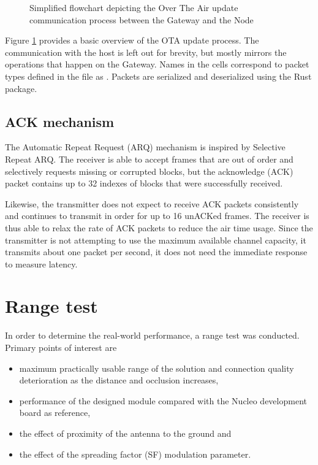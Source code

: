 \begin{figure}[p]
    
    \caption{\label{fig:ota-algo}Simplified flowchart depicting the Over The Air update communication process between the Gateway and the Node}
\end{figure}

Figure \ref{fig:ota-algo} provides a basic overview of the OTA update process. The communication with the host is left out for brevity, but mostly mirrors the operations that happen on the Gateway. Names in the cells correspond to packet types defined in the  file as . Packets are serialized and deserialized using the  Rust package.

\subsection{ACK mechanism}
The Automatic Repeat Request (ARQ) mechanism is inspired by Selective Repeat ARQ. The receiver is able to accept frames that are out of order and selectively requests missing or corrupted blocks, but the acknowledge (ACK) packet contains up to 32 indexes of blocks that were successfully received. 

Likewise, the transmitter does not expect to receive ACK packets consistently and continues to transmit in order for up to 16 unACKed frames. The receiver is thus able to relax the rate of ACK packets to reduce the air time usage. Since the transmitter is not attempting to use the maximum available channel capacity, it transmits about one packet per second, it does not need the immediate response to measure latency.

\section{Range test}
In order to determine the real-world performance, a range test was conducted. Primary points of interest are
\begin{itemize}
    \item maximum practically usable range of the solution and connection quality deterioration as the distance and occlusion increases,
    \item performance of the designed module compared with the Nucleo development board as reference,
    \item the effect of proximity of the antenna to the ground and
    \item the effect of the spreading factor (SF) modulation parameter.
\end{itemize}

